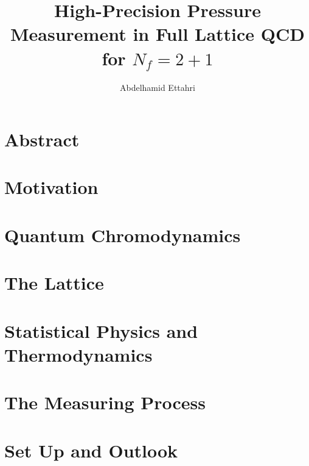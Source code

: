 \documentclass[
	english,
	ruledheaders=section,%
	class=report,%
	thesis={type=Proposal},%
	accentcolor=9c,%
	custommargins=true,%
	marginpar=false,%
	parskip=half-,%
	fontsize=11pt,%
]{tudapub}
\begin{document}
\title{High-Precision Pressure Measurement in Full Lattice QCD for $N_f=2+1$}
\author{Abdelhamid Ettahri}


\maketitle

\chapter*{Abstract} \tableofcontents


\listoftodos    {}      \newpage


\chapter{Motivation}                            \newpage

\chapter{Quantum Chromodynamics}                \newpage

\chapter{The Lattice}                           \newpage

\chapter{Statistical Physics and Thermodynamics}\newpage

\chapter{The Measuring Process}                 \newpage

\chapter{Set Up and Outlook}                \newpage




    \newpage



\end{document}
